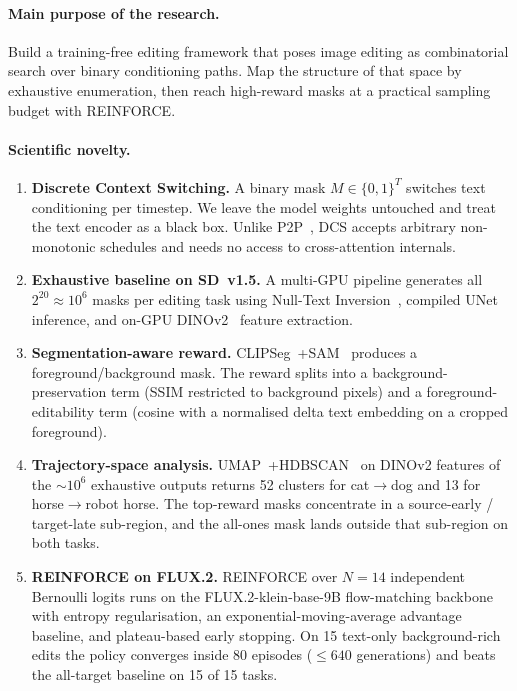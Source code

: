 \paragraph{Main purpose of the research.}
Build a training-free editing framework that poses image editing as combinatorial search over binary conditioning paths. Map the structure of that space by exhaustive enumeration, then reach high-reward masks at a practical sampling budget with REINFORCE.

\paragraph{Scientific novelty.}
\begin{enumerate}
    \item \textbf{Discrete Context Switching.} A binary mask $M \in \{0,1\}^T$ switches text conditioning per timestep. We leave the model weights untouched and treat the text encoder as a black box. Unlike P2P~\cite{hertz2022prompt}, DCS accepts arbitrary non-monotonic schedules and needs no access to cross-attention internals.

    \item \textbf{Exhaustive baseline on SD~v1.5.} A multi-GPU pipeline generates all $2^{20}\approx 10^6$ masks per editing task using Null-Text Inversion~\cite{mokady2023null}, compiled UNet inference, and on-GPU DINOv2~\cite{oquab2023dinov2} feature extraction.

    \item \textbf{Segmentation-aware reward.} CLIPSeg~\cite{luddecke2022image}+SAM~\cite{kirillov2023segment} produces a foreground/background mask. The reward splits into a background-preservation term (SSIM restricted to background pixels) and a foreground-editability term (cosine with a normalised delta text embedding on a cropped foreground).

    \item \textbf{Trajectory-space analysis.} UMAP~\cite{mcinnes2018umap}+HDBSCAN~\cite{campello2013density} on DINOv2 features of the $\sim 10^6$ exhaustive outputs returns 52 clusters for cat$\to$dog and 13 for horse$\to$robot horse. The top-reward masks concentrate in a source-early / target-late sub-region, and the all-ones mask lands outside that sub-region on both tasks.

    \item \textbf{REINFORCE on FLUX.2.} REINFORCE over $N=14$ independent Bernoulli logits runs on the FLUX.2-klein-base-9B flow-matching backbone with entropy regularisation, an exponential-moving-average advantage baseline, and plateau-based early stopping. On 15 text-only background-rich edits the policy converges inside 80 episodes ($\le 640$ generations) and beats the all-target baseline on 15 of 15 tasks.
\end{enumerate}

